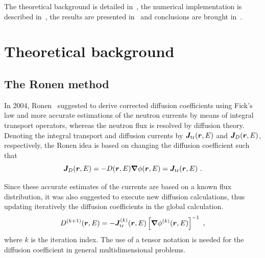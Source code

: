 
The theoretical background is detailed in~, the numerical implementation is described in~, the results are presented in~ and conclusions are brought in~.

%
\section{Theoretical background}
\label{sec:theory}

%
\subsection{The Ronen method}
\label{sec:RM}

In 2004, Ronen~\cite{Ronen-2004} suggested to derive corrected diffusion coefficients using Fick's law and more accurate estimations of the neutron currents by means of integral transport operators, whereas the neutron flux is resolved by diffusion theory. Denoting the integral transport and diffusion currents by $\bm{J}_{\textrm{\scriptsize{tr}}}(\bm{r},E)$ and $\bm{J}_D(\bm{r},E)$, respectively, the Ronen idea is based on changing the diffusion coefficient such that
\begin{equation}\label{eq:Fick}
\bm{J}_D(\bm{r},E) = -D(\bm{r},E)\bm{\nabla}\phi(\bm{r},E) = \bm{J}_{\textrm{\scriptsize{tr}}}(\bm{r},E) \,\, . 
\end{equation}

Since these accurate estimates of the currents are based on a known flux distribution, it was also suggested to execute new diffusion calculations, thus updating iteratively the diffusion coefficients in the global calculation. 
\begin{equation}\label{eq:RM-it}
D^{(k+1)}(\bm{r},E) = - \bm{J}_{\textrm{\scriptsize{tr}}}^{(k)}(\bm{r},E) \left[\bm{\nabla}\phi^{(k)}(\bm{r},E)\right]^{-1} \,\, ,
\end{equation}
where $k$ is the iteration index. The use of a tensor notation is needed for the diffusion coefficient in general multidimensional problems.

